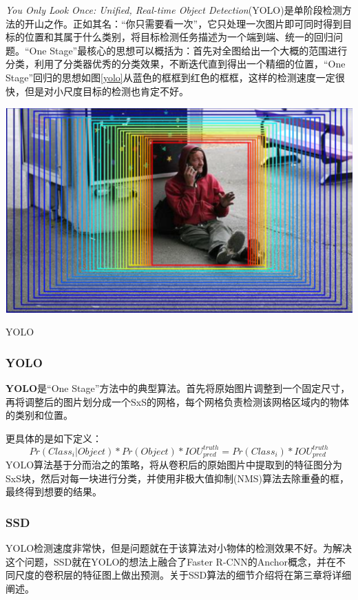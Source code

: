 \textit{You Only Look Once: Unified, Real-time Object Detection}(YOLO)\cite{yolo}是单阶段检测方法的开山之作。正如其名：“你只需要看一次”，它只处理一次图片即可同时得到目标的位置和其属于什么类别，将目标检测任务描述为一个端到端、统一的回归问题。“One Stage”最核心的思想可以概括为：首先对全图给出一个大概的范围进行分类，利用了分类器优秀的分类效果，不断迭代直到得出一个精细的位置，“One Stage”回归的思想如图\ref{yolo}从蓝色的框框到红色的框框，这样的检测速度一定很快，但是对小尺度目标的检测也肯定不好。
\begin{uscfigure}
	\includegraphics[width=\textwidth]{./Pictures/od_regressor.png}	
	\caption{YOLO}
	\label{yolo}
\end{uscfigure}

\subsubsection{YOLO}
\textbf{YOLO}是“One Stage”方法中的典型算法。首先将原始图片调整到一个固定尺寸，再将调整后的图片划分成一个SxS的网格，每个网格负责检测该网格区域内的物体的类别和位置。

更具体的是如下定义：
\begin{equation}
	Pr(Class_i | Object) * Pr(Object) * IOU_{pred}^{truth} = Pr(Class_i) * IOU_{pred}^{truth}
\end{equation}
YOLO算法基于分而治之的策略，将从卷积后的原始图片中提取到的特征图分为SxS块，然后对每一块进行分类，并使用非极大值抑制(NMS\cite{soft-nms})算法去除重叠的框，最终得到想要的结果。
\subsubsection{SSD}
YOLO检测速度非常快，但是问题就在于该算法对小物体的检测效果不好。为解决这个问题，SSD就在YOLO的想法上融合了Faster R-CNN的Anchor概念，并在不同尺度的卷积层的特征图上做出预测。关于SSD算法的细节介绍将在第三章将详细阐述。
